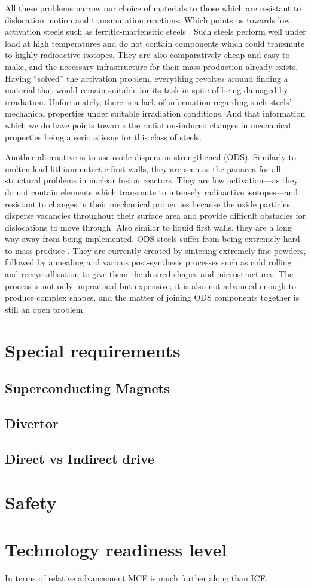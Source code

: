 \documentclass[12pt, a4paper]{article}
\begin{document}
		All these problems narrow our choice of materials to those which are resistant to dislocation motion and transmutation reactions. Which points us towards low activation steels such as ferritic-martensitic steels \cite{fms1}. Such steels perform well under load at high temperatures and do not contain components which could transmute to highly radioactive isotopes. They are also comparatively cheap and easy to make, and the necessary infrastructure for their mass production already exists. Having ``solved'' the activation problem, everything revolves around finding a material that would remain suitable for its task in spite of being damaged by irradiation. Unfortunately, there is a lack of information regarding such steels' mechanical properties under suitable irradiation conditions. And that information which we do have \cite{fms1, fms2, fms3, fms4} points towards the radiation-induced changes in mechanical properties being a serious issue for this class of steels.
		
		Another alternative is to use oxide-dispersion-strengthened (ODS). Similarly to molten lead-lithium eutectic first walls, they are seen as the panacea for all structural problems in nuclear fusion reactors. They are low activation---as they do not contain elements which transmute to intensely radioactive isotopes---and resistant to changes in their mechanical properties because the oxide particles disperse vacancies throughout their surface area and provide difficult obstacles for dislocations to move through. Also similar to liquid first walls, they are a long way away from being implemented. ODS steels suffer from being extremely hard to mass produce \cite{ods1}. They are currently created by sintering extremely fine powders, followed by annealing and various post-synthesis processes such as cold rolling and recrystallisation to give them the desired shapes and microstructures. The process is not only impractical but expensive; it is also not advanced enough to produce complex shapes, and the matter of joining ODS components together is still an open problem.
	\section{Special requirements}
		\subsection{Superconducting Magnets}
		\subsection{Divertor}\label{ss:div}
		\subsection{Direct vs Indirect drive}
	\section{Safety}
	\section{Technology readiness level}
		In terms of relative advancement MCF is much further along than ICF.
	
	
\end{document}
